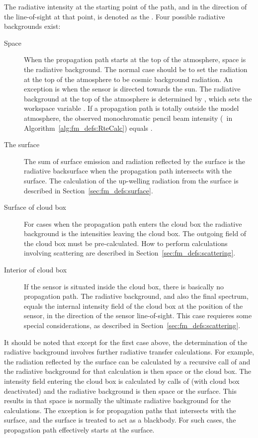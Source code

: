 The radiative intensity at the starting point of the path, and in the
direction of the line-of-sight at that point, is denoted as the
. Four possible radiative backgrounds
exist:
\begin{description}
\item[Space] When the propagation path starts at the top of the
  atmosphere, space is the radiative background. The normal case
  should be to set the radiation at the top of the atmosphere to be
  cosmic background radiation. An exception is when the sensor is
  directed towards the sun. The radiative background at the top of
  the atmosphere is determined by , which
  sets the workspace variable . If a propagation
  path is totally outside the model atmosphere, the observed
  monochromatic pencil beam intensity (\ in
  Algorithm~\ref{alg:fm_defs:RteCalc}) equals .
\item[The surface] The sum of surface emission and radiation reflected
  by the surface is the radiative backsurface when the propagation path
  intersects with the surface. The calculation of the up-welling
  radiation from the surface is described in
  Section~\ref{sec:fm_defs:surface}.
\item[Surface of cloud box] For cases when the propagation path enters
  the cloud box the radiative background is the intensities leaving
  the cloud box. The outgoing field of the cloud box must be
  pre-calculated. How to perform calculations involving scattering are
  described in Section~\ref{sec:fm_defs:scattering}.
\item[Interior of cloud box] If the sensor is situated inside the
  cloud box, there is basically no propagation path. The radiative
  background, and also the final spectrum, equals the internal
  intensity field of the cloud box at the position of the sensor, in
  the direction of the sensor line-of-sight.  This case requieres
  some special considerations, as described in
  Section~\ref{sec:fm_defs:scattering}.
\end{description}
It should be noted that except for the first case above, the
determination of the radiative background involves further radiative
transfer calculations. For example, the radiation reflected by the
surface can be calculated by a recursive call of 
and the radiative background for that calculation is then space or the
cloud box. The intensity field entering the cloud box is calculated by
calls of  (with cloud box deactivated) and the
radiative background is then space or the surface. This results in that
space is normally the ultimate radiative background for the
calculations. The exception is for propagation paths that intersects
with the surface, and the surface is treated to act as a blackbody. For
such cases, the propagation path effectively starts at the surface.


